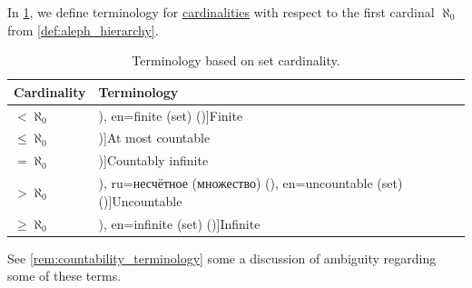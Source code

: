 \begin{definition}\label{def:aleph_zero_related_cardinalities}
  In \cref{tab:def:aleph_zero_related_cardinalities}, we define terminology for \hyperref[def:cardinality]{cardinalities} with respect to the first cardinal \( \aleph_0 \) from \cref{def:aleph_hierarchy}.

  \begin{table}
    \begin{center}
      \begin{tabular}{ll}
        \toprule
        Cardinality         & Terminology \\
        \midrule
        \( < \aleph_0 \)    & \term[ru=конечное (множество) (\cite[154]{КолмогоровДрагалин2006ЛогикаДополнительныеГлавы}), en=finite (set) (\cite[def. 6.2.32(iii)]{Hinman2005Logic})]{Finite} \\
        \( \leq \aleph_0 \) & \term[en=at most countable (set) (\cite[30]{Jech2006SetTheory})]{At most countable} \\
        \( = \aleph_0 \)    & \term[en=countably infinite (set) (\cite[def. I.10.5]{Kunen2013SetTheory})]{Countably infinite} \\
        \( > \aleph_0 \)    & \term[bg=неизброимо (множество) (\cite[225]{ГеновМиховскиМоллов1991Алгебра}), ru=несчётное (множество) (\cite[14]{Александров1977ОбщаяТопология}), en=uncountable (set) (\cite[def. I.10.5]{Kunen2013SetTheory})]{Uncountable} \\
        \( \geq \aleph_0 \) & \term[ru=бесконечное (множество) (\cite[154]{КолмогоровДрагалин2006ЛогикаДополнительныеГлавы}), en=infinite (set) (\cite[def. 6.2.32(iii)]{Hinman2005Logic})]{Infinite} \\
        \bottomrule
      \end{tabular}
    \end{center}
    \caption{Terminology based on set cardinality.}\label{tab:def:aleph_zero_related_cardinalities}
  \end{table}
\end{definition}
\begin{comments}
  \item See \cref{rem:countability_terminology} some a discussion of ambiguity regarding some of these terms.
\end{comments}

